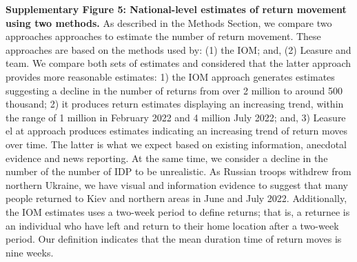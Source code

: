\documentclass[
  11pt,
]{article}
\begin{document}
\textbf{Supplementary Figure 5: National-level estimates of return
movement using two methods.} As described in the Methods Section, we
compare two approaches approaches to estimate the number of return
movement. These approaches are based on the methods used by: (1) the
IOM; and, (2) Leasure and team. We compare both sets of estimates and
considered that the latter approach provides more reasonable estimates:
1) the IOM approach generates estimates suggesting a decline in the
number of returns from over 2 million to around 500 thousand; 2) it
produces return estimates displaying an increasing trend, within the
range of 1 million in February 2022 and 4 million July 2022; and, 3)
Leasure el at approach produces estimates indicating an increasing trend
of return moves over time. The latter is what we expect based on
existing information, anecdotal evidence and news reporting. At the same
time, we consider a decline in the number of the number of IDP to be
unrealistic. As Russian troops withdrew from northern Ukraine, we have
visual and information evidence to suggest that many people returned to
Kiev and northern areas in June and July 2022. Additionally, the IOM
estimates uses a two-week period to define returns; that is, a returnee
is an individual who have left and return to their home location after a
two-week period. Our definition indicates that the mean duration time of
return moves is nine weeks.
\end{document}
